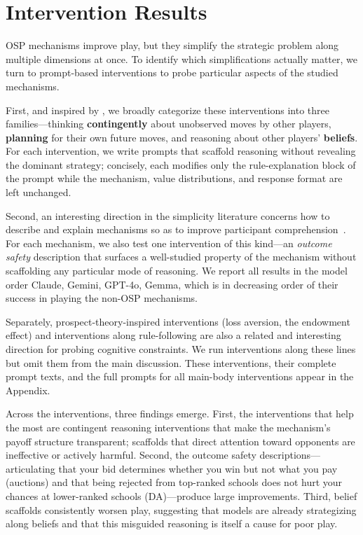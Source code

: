 \documentclass[format=acmsmall, review=false]{acmart}
\begin{document}
\section{Intervention Results} \label{sec:intervention-results}

OSP mechanisms improve play, but they simplify the strategic problem along multiple dimensions at once. To identify which simplifications actually matter, we turn to prompt-based interventions to probe particular aspects of the studied mechanisms. 

First, and inspired by \citet{li2024designing}, we broadly categorize these interventions into three families---thinking \textbf{contingently} about unobserved moves by other players, \textbf{planning} for their own future moves, and reasoning about other players' \textbf{beliefs}. For each intervention, we write prompts that scaffold reasoning without revealing the dominant strategy; concisely, each modifies only the rule-explanation block of the prompt while the mechanism, value distributions, and response format are left unchanged. 

Second, an interesting direction in the simplicity literature concerns how to describe and explain mechanisms so as to improve participant comprehension~\citep{gonczarowski2023strategyproofness}. For each mechanism, we also test one intervention of this kind---an \emph{outcome safety} description that surfaces a well-studied property of the mechanism without scaffolding any particular mode of reasoning. We report all results in the model order Claude, Gemini, GPT-4o, Gemma, which is in decreasing order of their success in playing the non-OSP mechanisms.

Separately, prospect-theory-inspired interventions (loss aversion, the endowment effect) and interventions along rule-following are also a related and interesting direction for probing cognitive constraints. We run interventions along these lines but omit them from the main discussion. These interventions, their complete prompt texts, and the full prompts for all main-body interventions appear in the Appendix.

Across the interventions, three findings emerge. First, the interventions that help the most are contingent reasoning interventions that make the mechanism's payoff structure transparent; scaffolds that direct attention toward opponents are ineffective or actively harmful. Second, the outcome safety descriptions---articulating that your bid determines whether you win but not what you pay (auctions) and that being rejected from top-ranked schools does not hurt your chances at lower-ranked schools (DA)---produce large improvements. Third, belief scaffolds consistently worsen play, suggesting that models are already strategizing along beliefs and that this misguided reasoning is itself a cause for poor play.
\end{document}
